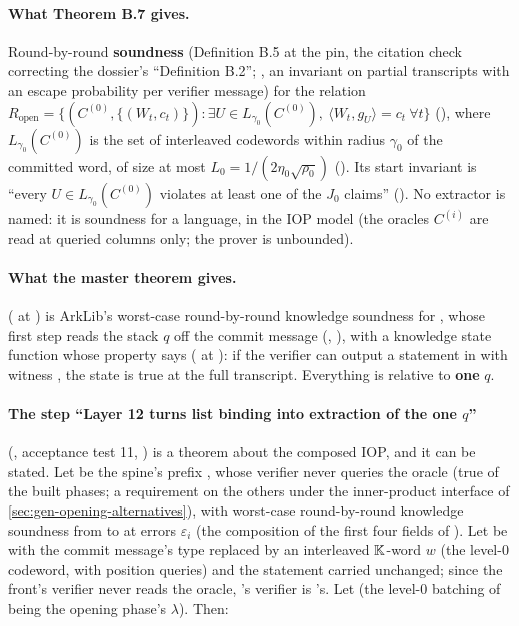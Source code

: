 \paragraph{What Theorem B.7 gives.} Round-by-round \textbf{soundness} (Definition B.5 at the pin,
the citation check correcting the dossier's ``Definition B.2''; , an invariant on partial transcripts with an escape probability per verifier message)
for the relation
$R_{\mathrm{open}} = \{(C^{(0)}, \{(W_t, c_t)\}) : ∃ U ∈ L_{γ_0}(C^{(0)}),\ ⟨W_t, g_U⟩ = c_t\ ∀ t\}$
(), where $L_{γ_0}(C^{(0)})$ is the set of interleaved codewords within radius
$γ_0$ of the committed word, of size at most $L_0 = 1/(2η_0\sqrt{ρ_0})$ (). Its start
invariant is ``every $U ∈ L_{γ_0}(C^{(0)})$ violates at least one of the $J_0$ claims''
(). No extractor is named: it is soundness for a language, in the IOP model (the oracles
$C^{(i)}$ are read at queried columns only; the prover is unbounded).

\paragraph{What the master theorem gives.} 
( at ) is ArkLib's worst-case round-by-round knowledge
soundness for , whose first step reads the stack $q$ off the commit message
(, ), with a knowledge state function whose
 property says ( at ): if
the verifier can output a statement in  with witness , the state is true at
the full transcript. Everything is relative to \textbf{one} $q$.

\paragraph{The step ``Layer 12 turns list binding into extraction of the one $q$''}
(, acceptance test 11, ) is a theorem about the composed IOP, and it
can be stated. Let  be the spine's prefix ,
whose verifier never queries the oracle (true of the built phases; a requirement on the others under
the inner-product interface of \cref{sec:gen-opening-alternatives}), with worst-case round-by-round
knowledge soundness from  to  at errors $ε_i$ (the composition of the
first four fields of ). Let  be  with the commit
message's type replaced by an interleaved $\mathbb{K}$-word $w$ (the level-0 codeword, with position
queries) and the statement carried unchanged; since the front's verifier never reads the oracle,
's verifier is 's. Let  (the level-0 batching
of  being the opening phase's $λ$). Then:

